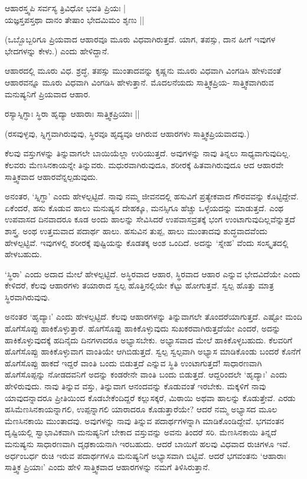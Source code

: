 \begin{shloka}
ಆಹಾರಸ್ತ್ವಪಿ ಸರ್ವಸ್ಯ ತ್ರಿವಿಧೋ ಭವತಿ ಪ್ರಿಯಃ |\\
ಯಜ್ಞಸ್ತಪಸ್ತಥಾ ದಾನಂ ತೇಷಾಂ ಭೇದಮಿಮಂ ಶೃಣು ||
\end{shloka}

(ಒಬ್ಬೊಬ್ಬರಿಗೂ ಪ್ರಿಯವಾದ ಆಹಾರವೂ ಮೂರು ವಿಧವಾಗಿರುತ್ತದೆ. ಯಾಗ, ತಪಸ್ಸು, ದಾನ ಹೀಗೆ ಇವುಗಳ ಭೇದಗಳನ್ನು ಕೇಳು.) ಎಂದು ಹೇಳಿದ್ದಾನೆ.


ಆಹಾರದಲ್ಲಿ ಮೂರು ವಿಧ. ಶ್ರದ್ಧೆ, ತಪಸ್ಸು ಮುಂತಾದವನ್ನು  ಕೃಷ್ಣನು ಮೂರು ವಿಧವಾಗಿ ವಿಂಗಡಿಸಿ ಹೇಳುವಂತೆ ಆಹಾರವನ್ನೂ ಮೂರು ವಿಧವಾಗಿ ವಿಂಗಡಿಸಿ ಹೇಳುತ್ತಾನೆ. ಮೊದಲನೆಯದು ಸಾತ್ತ್ವಿಕಪ್ರಿಯ- ಸಾತ್ತ್ವಿಕವಾಗಿರುವ ಮನುಷ್ಯನಿಗೆ ಪ್ರಿಯವಾದ ಆಹಾರ.

\begin{shloka}
ರಸ್ಯಾಸ್ನಿಗ್ಧಾಃ ಸ್ಥಿರಾ ಹೃದ್ಯಾ ಆಹಾರಾಃ ಸಾತ್ತ್ವಿಕಪ್ರಿಯಾಃ ||
\end{shloka}

(ರಸವುಳ್ಳವು, ಸ್ನಿಗ್ಧವಾಗಿರುವುವು, ಸ್ಥಿರವೂ ಹೃದ್ಯವೂ ಆಗಿರುವ ಆಹಾರಗಳು ಸಾತ್ತ್ವಿಕಪ್ರಿಯವಾದವು.)

ಕೆಲವು ವಸ್ತುಗಳನ್ನು ತಿನ್ನುವಾಗಲೇ ಬಾಯಿಯೆಲ್ಲಾ ಉರಿಯುತ್ತದೆ. ಅವುಗಳನ್ನು ನಾವು ತಿನ್ನಲು ಸಾಧ್ಯವಾಗುವುದಿಲ್ಲ. ಕೆಲವರು ಮೆಣಸಿನಕಾಯನ್ನೇ ತಿನ್ನುವರು. ಮಧುರವಾಗಿರುವುದೂ, ಶರೀರಕ್ಕೆ ಹಿತವಾಗಿರುವುದೂ ಆದ ಆಹಾರವೇ ಸಾತ್ತ್ವಿಕವಾದ ಆಹಾರವೆನ್ನಲ್ಪಡುವುದು.

ಅನಂತರ, `ಸ್ನಿಗ್ಧಾ' ಎಂದು ಹೇಳಲ್ಪಟ್ಟಿದೆ. ನಾವು ನಮ್ಮ ಜೀವನದಲ್ಲಿ ಹಸುವಿಗೆ ಪ್ರತ್ಯೇಕವಾದ ಗೌರವವನ್ನು ಕೊಟ್ಟಿದ್ದೇವೆ. ಏಕೆಂದರೆ, ಹಸು ಕೊಡುವ ಹಾಲು ಮನುಷ್ಯನ ದೇಹಕ್ಕೂ, ಮನಸ್ಸಿಗೂ ಹೆಚ್ಚು ಒಳ್ಳೆಯದನ್ನು ಮಾಡುತ್ತದೆ. ಎಂಥ ಉಪವಾಸದ ದಿನವಾದರೂ ಕೂಡ ಅಂದು ಹಾಲನ್ನು ಸೇವಿಸಿದರೆ ಉಪವಾಸವ್ರತಕ್ಕೆ ಭಂಗ ಉಂಟಾಗುವುದಿಲ್ಲವೆನ್ನುತ್ತದೆ ಶಾಸ್ತ್ರ. ಅಂಥ ಉತ್ತಮವಾದ ಪದಾರ್ಥ ಹಾಲು. ಹಸುವಿನ ತುಪ್ಪ, ಹಾಲು ಮುಂತಾದವು ಶುದ್ಧವಾದವೆಂದು ಹೇಳಲ್ಪಟ್ಟಿವೆ. ಇವುಗಳಲ್ಲಿ ಶರೀರಕ್ಕೆ ಪುಷ್ಟಿಯನ್ನು ಕೊಡತಕ್ಕ ಅಂಶ ಒಂದಿದೆ. ಅದನ್ನು `ಸ್ನೇಹ' ವೆಂದು ಸಂಸ್ಕೃತದಲ್ಲಿ ಹೇಳಬಹುದು.

`ಸ್ಥಿರಾ' ಎಂದು ಅದಾದ ಮೇಲೆ ಹೇಳಲ್ಪಟ್ಟಿದೆ. ಅಸ್ಥಿರವಾದ ಆಹಾರ, ಸ್ಥಿರವಾದ ಆಹಾರ ಎನ್ನುವ ಭೇದವಿದೆಯೇ ಎಂದು ಕೇಳಿದರೆ, ಕೆಲವು ಆಹಾರಗಳು ತಯಾರಾದ ಸ್ವಲ್ಪ ಹೊತ್ತಿನಲ್ಲಿಯೇ ಕೆಟ್ಟು ಹೋಗುತ್ತವೆ. ಸ್ವಲ್ಪ ಹೊತ್ತು ಮಾತ್ರ ಸ್ಥಿರವಾಗಿರುವುವು.

ಅನಂತರ `ಹೃದ್ಯಾಃ' ಎಂದು ಹೇಳಲ್ಪಟ್ಟಿದೆ. ಕೆಲವು ಆಹಾರಗಳನ್ನು ತಿನ್ನುವಾಗಲೇ ತೊಂದರೆಯಾಗುತ್ತದೆ. ಎಷ್ಟೋ ಮಂದಿ ಹೊಗೆಸೊಪ್ಪು ಹಾಕಿಕೊಳ್ಳುತ್ತಾರೆ. ಹೊಗೆಸೊಪ್ಪು ಹಾಕಿಕೊಳ್ಳುವುದು ಸುಖಕರವಾಗಿರುತ್ತದೆಯೇ ಎಂದರೆ, ಅದನ್ನು ಹಾಕಿಕೊಳ್ಳುವುದಕ್ಕೆ ಹದಿನೈದು ದಿನಗಳಾದರೂ ಅಭ್ಯಾಸಬೇಕು. ಅಭ್ಯಾಸವಾದ ಮೇಲೆ ಹಾಕಿಕೊಳ್ಳಬಹುದು. ಕೆಲವರಿಗೆ ಹೊಗೆಸೊಪ್ಪು ಹಾಕಿಕೊಳ್ಳುವಾಗ ವಾಂತಿಯೇ ಆಗಿಬಿಡುತ್ತದೆ. ಸ್ವಲ್ಪ ಸ್ವಲ್ಪವಾಗಿ ಅಭ್ಯಾಸ ಮಾಡಿಕೊಂಡು ಬಂದರೆ ಕೊನೆಗೆ ಹೊಗೆಸೊಪ್ಪು ಹಾಕದೆ ಇದ್ದರೆ ವಾಂತಿ ಬಂದು ಬಿಡುತ್ತದೆ ಎನ್ನುವ ಸ್ಥಿತಿ ಉಂಟಾಗುತ್ತದೆ! ಸಾಧಾರಣವಾಗಿ ಹೊಗೆಸೊಪ್ಪನ್ನು ನೋಡದವನಿಗೆ ಅದನ್ನು ಕಂಡರೇನೇ ವಾಂತಿ ಬಂದು ಬಿಡುತ್ತದೆ. ಆದ್ದರಿಂದಲೇ `ಹೃದ್ಯಾಃ' ಎಂದು ಹೇಳಿರುವುದು. ನಾವು ತಿನ್ನುವ ವಸ್ತು, ತಿನ್ನುವಾಗ ಆನಂದವನ್ನು ಕೊಡುವಂತೆ ಇರಬೇಕು. ಮಕ್ಕಳಿಗೆ ನಾವು ಯಾವುದನ್ನಾದರೂ ಪ್ರೀತಿಯಿಂದ ಕೊಡಬೇಕೆಂದಿದ್ದರೆ ಕಲ್ಲುಸಕ್ಕರೆ, ಮಿಠಾಯಿ ಅಥವಾ ಹಾಲನ್ನು ಕೊಡುತ್ತೇವೆ. ಎರಡು ಹಸಿಮೆಣಸಿನಕಾಯನ್ನಾಗಲಿ, ಉಪ್ಪನ್ನಾಗಲಿ ಯಾರಾದರೂ ಕೊಡುತ್ತಾರೆಯೇ? ಆದರೆ ನಮ್ಮ ಅಭ್ಯಾಸದ ಮೂಲ ಮೆಣಸಿನಕಾಯಿ ಮುಂತಾದವು. ಅವುಗಳನ್ನು ನಾವು ತಿನ್ನುವ ಪದಾರ್ಥಗಳನ್ನಾಗಿ ಮಾಡಿಕೊಂಡಿದ್ದೇವೆ. ಭಗವಂತನ ದೃಷ್ಟಿಯಲ್ಲಿ ಸ್ವಾಭಾವಿಕವಾಗಿ ಮನುಷ್ಯನಿಗೆ ಬೇಕಾದ ವಸ್ತುವನ್ನು ಅವನು ತಿಂದರೆ ಸರಿ. ಮೆಣಸಿನಕಾಯಿ ತಿನ್ನದೆ ಮನುಷ್ಯನು ಸಾಧಾರಣವಾಗಿ ದೃಢಕಾಯನಾಗಿ ಇರಬಹುದು. ಆದರೆ ಬಾಯಿಗೆ ಹಲವು ವಿಧವಾದ ರುಚಿಗಳೂ ಇವೆ. ಅರ್ಧಂಬರ್ಧ ರುಚಿ ಇರುವ ಪದಾರ್ಥಗಳೂ ಮನುಷ್ಯನಿಗೆ ಅಭ್ಯಾಸವಾಗಿ ಬಿಟ್ಟಿವೆ. ಆದರೆ ಭಗವಂತನು `ಆಹಾರಾಃ ಸಾತ್ತ್ವಿಕ ಪ್ರಿಯಾಃ' ಎಂದು ಹೇಳಿ ಸಾತ್ತ್ವಿಕವಾದ ಆಹಾರಗಳನ್ನು ನಮಗೆ ತಿಳಿಸಿರುತ್ತಾನೆ.

